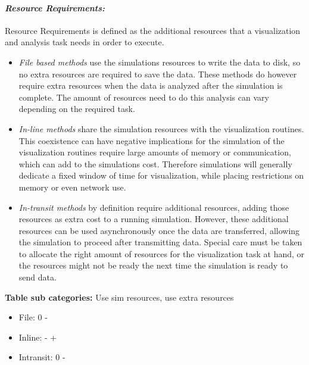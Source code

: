 \paragraph{\emph{Resource Requirements:}}
Resource Requirements is defined as the additional resources that a visualization and analysis task needs in order to execute.
\begin{itemize}
    \item \emph{File based methods} use the simulations resources to write the data to disk, so no extra resources are required to save the data. These methods do however require extra resources when the data is analyzed after the simulation is complete. The amount of resources need to do this analysis can vary depending on the required task. 
    
    \item \emph{In-line methods} share the simulation resources with the visualization routines. This coexistence can have negative implications for the simulation of the visualization routines require large amounts of memory or communication, which can add to the simulations cost. Therefore simulations will generally dedicate a fixed window of time for visualization, while placing restrictions on memory or even network use.
    
    \item \emph{In-transit methods} by definition require additional resources, adding those resources as extra cost to a running simulation. However, these additional resources can be used asynchronously once the data are transferred, allowing the simulation to proceed after transmitting data. Special care must be taken to allocate the right amount of resources for the visualization task at hand, or the resources might not be ready the next time the simulation is ready to send data.
\end{itemize}

\textbf{Table sub categories:} Use sim resources, use extra resources
\begin{itemize}
    \item File: 0 -
    \item Inline: - +
    \item Intransit: 0 -
\end{itemize}

